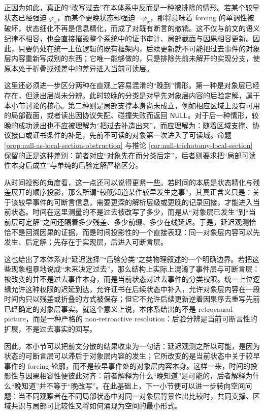 正因为如此，真正的“改写过去”在本体系中反而是一种被排除的情形。若某个较早状态已经强迫 \(\varphi_x\)，而某个更晚状态却强迫 \(\neg\varphi_x\)，那将意味着 forcing 的单调性被破坏，状态细化不再是信息精化，而成了对既有断言的撤销。这不仅与前文的语义纪律不相容，也会直接摧毁整个系统中的证书审计、局部截面与因果相容更新。因此，只要仍处在统一上位逻辑的既有框架内，后续更新就不可能把过去事件的对象层内容重新写成别的东西；它唯一能够做的，只是排除先前未解开的实现分支，使原本处于折叠或残差中的差异进入当前可读层。

这里还必须进一步区分两种在直观上容易混淆的“晚到”情形。第一种是对象层已经存在，但读出层尚未分辨。此时较晚的分类是对早先对象层内容的后验定解，属于本小节讨论的核心。第二种则是局部支撑本身尚未成立，例如相应区域上没有可用的局部截面，或者读出因协议失配、碰撞失败而返回 \(\mathsf{NULL}\)。对于后一种情形，较晚的成功读出也不应被理解为“把过去补造出来”，而应理解为：随着区域支撑、协议接口或证书条件的补足，先前不可读的对象第一次进入了可读域。命题 \ref{prop:null-as-local-section-obstruction} 与推论 \ref{cor:null-trichotomy-local-section} 保留的正是这种差别：前者对应“对象先在而分类后定”，后者则要求把“局部可读性本身后成立”与单纯的后验定解严格区分。

从时间投影的角度看，这一点还可以说得更紧一些。若时间的本质是状态精化与残差展开的顺序投影，那么所谓“较晚知道某件较早发生之事”，其真正含义只是：关于该较早事件的可断言信息，需要更深的解析层级或更晚的记录回接，才能进入当前状态。时间在这里测量的不是过去被改写了多少，而是从“对象层已发生”到“当前层可定解”之间还隔着多少残差、多少前缀、多少在线延迟。于是，延迟观测恰恰不是回溯因果的证据，而是时间投影性的一个直接表现：同一对象层内容可以先发生、后定解；先存在于实现层，后进入可断言层。

这也给出了本体系对“延迟选择”“后验分类”之类物理叙述的一个明确边界。若把这些现象粗暴地说成“未来决定过去”，那么结构上实际上混淆了事件层与可断言层：被改变的并不是过去事件本身，而是当前状态对过去事件的分类权限。统一上位逻辑允许这种权限的迟延到达，允许证书在后续状态中补入，允许对象层内容在一段时间内只以残差或折叠的方式被保存；但它不允许后续更新逆着因果序去重写先前已经确定的对象层事实。就这个意义上说，本体系给出的不是 retrocausal picture，而是一种严格的 non-retroactive resolution：后验分辨是当前可断言性的扩展，不是过去事实的回写。

因此，本小节可以把前文分散的结果收束为一句话：延迟观测之所以可能，是因为状态的可断言层可以滞后于对象层内容的发生；它所改变的是当前状态中关于较早事件的 forcing 轮廓，而不是较早事件处的对象层内容本身。这样一来，时间的投影性与因果相容性便彼此对齐：前者解释为什么“晚知道”是可能的，后者解释为什么“晚知道”并不等于“晚改写”。在此基础上，下一小节便可以进一步转向空间问题：当不同观察者在不同局部状态中对同一对象层背景作出比较时，共同支撑、区域共识与局部可比较性又将如何涌现为空间的最小形式。

